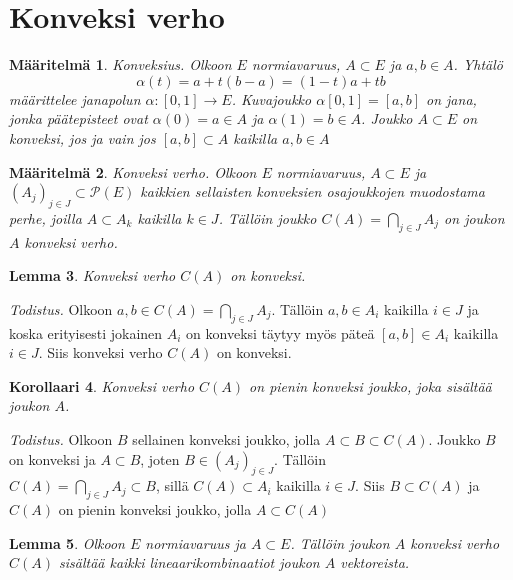 \documentclass[12pt,a4paper,reqno]{amsart}
\newtheorem{maar}{Määritelmä}[section]
\newtheorem{lemma}[maar]{Lemma}
\newtheorem{korollaari}[maar]{Korollaari}
\begin{document}
\section{Konveksi verho}
\begin{maar}%
Konveksius. \emph{Olkoon $E$ normiavaruus, $A\subset E$ ja $a,b\in A$. Yhtälö 
$$\alpha (t)=a+t(b-a)=(1-t)a+tb$$ 
määrittelee janapolun $\alpha \colon [0,1]\rightarrow E$. Kuvajoukko $\alpha [0,1] = [a,b]$ on jana, jonka päätepisteet ovat $\alpha (0)=a\in A$ ja $\alpha (1)=b\in A$. 
Joukko $A\subset E$ on konveksi, jos ja vain jos $[a,b]\subset A$ kaikilla $a,b\in A$ 
}
\end{maar}
\begin{maar}Konveksi verho. \emph{Olkoon $E$ normiavaruus, $A\subset E$ ja $(A_j)_{j\in J}\subset \mathcal{P}(E)$ 
kaikkien sellaisten konveksien osajoukkojen muodostama perhe, joilla %
$A\subset A_k$ kaikilla $k\in J$. Tällöin joukko $C(A)=\bigcap_{j\in J} A_j$ on joukon $A$ konveksi verho. }
\end{maar}
\begin{lemma} \emph{Konveksi verho $C(A)$ on konveksi}.\end{lemma} 
\emph{Todistus.} Olkoon $a,b\in C(A)=\bigcap_{j\in J} A_j$. Tällöin $a,b\in A_i$ kaikilla $i\in J$ ja koska erityisesti jokainen $A_i$ on konveksi täytyy myös päteä $[a,b]\in A_i$ kaikilla $i\in J$. Siis konveksi verho $C(A)$ on konveksi.%
\begin{korollaari}\emph{Konveksi verho $C(A)$ on pienin konveksi joukko, joka sisältää joukon $A$.}
\end{korollaari}
\emph{Todistus.} Olkoon $B$ sellainen konveksi joukko, jolla $A\subset B\subset C(A)$. Joukko $B$ on konveksi ja $A\subset B$, joten $B\in (A_j)_{j\in J}$. Tällöin\\ $C(A)=\bigcap_{j\in J} A_j\subset B$, sillä $C(A)\subset A_i$ kaikilla $i\in J$. Siis $B\subset C(A)$ ja $C(A)$ on pienin konveksi joukko, jolla $A\subset C(A)$

\begin{lemma} \emph{Olkoon $E$ normiavaruus ja $A\subset E$. Tällöin joukon $A$ konveksi verho $C(A)$ sisältää kaikki lineaarikombinaatiot joukon $A$ vektoreista. }
\end{lemma}
\end{document}
